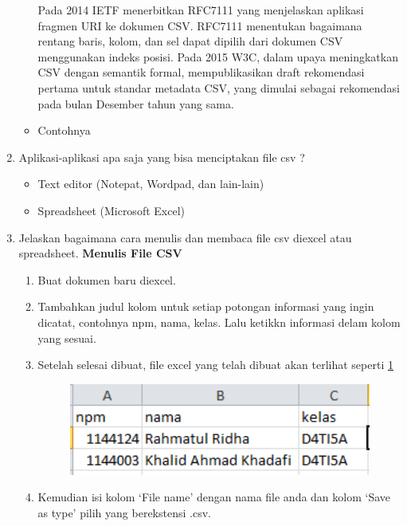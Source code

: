 \begin{enumerate}
\begin{itemize}
         Pada 2014 IETF menerbitkan RFC7111 yang menjelaskan aplikasi fragmen URI ke dokumen CSV. RFC7111 menentukan bagaimana rentang baris, kolom, dan sel dapat dipilih dari dokumen CSV menggunakan indeks posisi. Pada 2015 W3C, dalam upaya meningkatkan CSV dengan semantik formal, mempublikasikan draft rekomendasi pertama untuk standar metadata CSV, yang dimulai sebagai rekomendasi pada bulan Desember tahun yang sama.
  
         \item Contohnya
         
      \end{itemize}
   \item Aplikasi-aplikasi apa saja yang bisa menciptakan file csv ?
      \begin{itemize}
         \item Text editor (Notepat, Wordpad, dan lain-lain)
         \item Spreadsheet (Microsoft Excel)
      \end{itemize}
   \item Jelaskan bagaimana cara menulis dan membaca file csv diexcel atau spreadsheet.
      \textbf{Menulis File CSV}
      \begin{enumerate}
	      \item Buat dokumen baru diexcel.
         \item Tambahkan judul kolom untuk setiap potongan informasi yang ingin dicatat, contohnya npm, nama, kelas. Lalu ketikkn informasi delam kolom yang sesuai.
	      \item Setelah selesai dibuat, file excel yang telah dibuat akan terlihat seperti \ref{CSV}
		
		   \begin{figure}[H]	\includegraphics[width=10cm]{figures/rahma/Chapter4/1.png}
		   \centering
         \label{CSV}
		   \end{figure}
		
	      \item Kemudian isi kolom `File name' dengan nama file anda dan kolom `Save as type' pilih yang berekstensi .csv.
		

\end{enumerate}
\end{enumerate}
